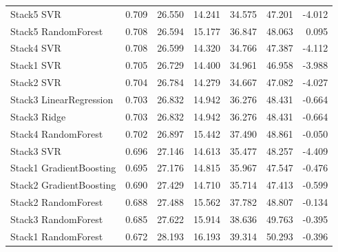 \begin{longtable}{lrrrrrr}
    Stack5 SVR & 0.709 & 26.550 & 14.241 & 34.575 & 47.201 & -4.012 \\
    Stack5 RandomForest & 0.708 & 26.594 & 15.177 & 36.847 & 48.063 & 0.095 \\
    Stack4 SVR & 0.708 & 26.599 & 14.320 & 34.766 & 47.387 & -4.112 \\
    Stack1 SVR & 0.705 & 26.729 & 14.400 & 34.961 & 46.958 & -3.988 \\
    Stack2 SVR & 0.704 & 26.784 & 14.279 & 34.667 & 47.082 & -4.027 \\
    Stack3 LinearRegression & 0.703 & 26.832 & 14.942 & 36.276 & 48.431 & -0.664 \\
    Stack3 Ridge & 0.703 & 26.832 & 14.942 & 36.276 & 48.431 & -0.664 \\
    Stack4 RandomForest & 0.702 & 26.897 & 15.442 & 37.490 & 48.861 & -0.050 \\
    Stack3 SVR & 0.696 & 27.146 & 14.613 & 35.477 & 48.257 & -4.409 \\
    Stack1 GradientBoosting & 0.695 & 27.176 & 14.815 & 35.967 & 47.547 & -0.476 \\
    Stack2 GradientBoosting & 0.690 & 27.429 & 14.710 & 35.714 & 47.413 & -0.599 \\
    Stack2 RandomForest & 0.688 & 27.488 & 15.562 & 37.782 & 48.807 & -0.134 \\
    Stack3 RandomForest & 0.685 & 27.622 & 15.914 & 38.636 & 49.763 & -0.395 \\
    Stack1 RandomForest & 0.672 & 28.193 & 16.193 & 39.314 & 50.293 & -0.396 \\
\end{longtable}


